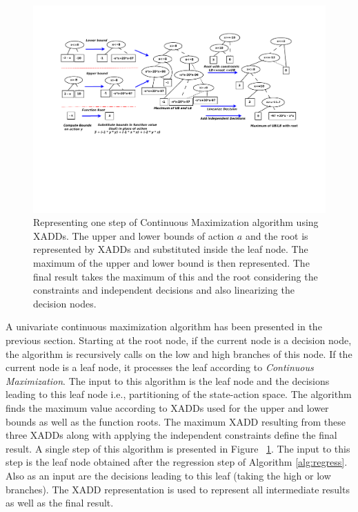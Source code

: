 \documentclass[twoside,11pt]{article}
\begin{document}
\vspace{10mm}
\begin{figure}[t!]
\hspace{-20mm}
\vspace{-15mm}
\includegraphics[width=1.27\textwidth]{Figures1/diagrams/maximum_cont_action2.pdf}
\vspace{-40mm}

\caption{\footnotesize Representing one step of Continuous Maximization algorithm using XADDs. The upper and lower bounds of action $a$ and the root is represented by XADDs and substituted inside the leaf node. The maximum of the upper and lower bound is then represented. The final result takes the maximum of this and the root considering the constraints and independent decisions and also linearizing the decision nodes.}
\label{fig:xadd_max}
\vspace{-8mm}
\end{figure}
\vspace{-6mm}

A univariate continuous maximization algorithm has been presented in the previous section. 
Starting at the root node, if the current node is a decision node, the algorithm is recursively calls on the low and high branches of this node. If the current node is a leaf node, it processes the leaf according to \emph{Continuous Maximization}. The input to this algorithm is the leaf node and the decisions leading to this leaf node i.e., partitioning of the state-action space. The algorithm finds the maximum value according to XADDs used for the upper and lower bounds as well as the function roots. The maximum XADD resulting from these three XADDs along with applying the independent constraints define the final result. A single step of this algorithm is presented in Figure ~\ref{fig:xadd_max}. The input to this step is the leaf node obtained after the regression step of Algorithm \ref{alg:regress}. Also as an input are the decisions leading to this leaf (taking the high or low branches).  The XADD representation is used to represent all intermediate results as well as the final result. 
\end{document}
